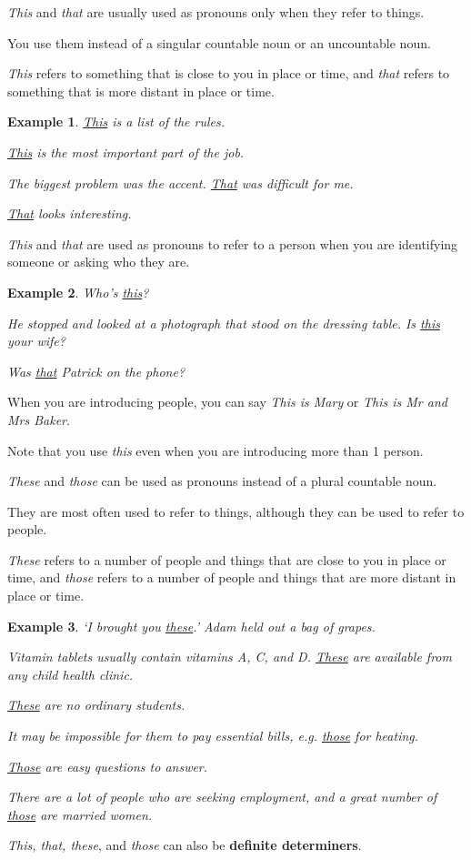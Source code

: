 \documentclass[oneside]{book}
\numberwithin{equation}{section}
\newtheorem{example}{Example}[section]
\begin{document}
%
\noindent{} \textit{This} and \textit{that} are usually used as pronouns only when they refer to things.

You use them instead of a singular countable noun or an uncountable noun.

\textit{This} refers to something that is close to you in place or time, and \textit{that} refers to something that is more distant in place or time.
\begin{example}
    \underline{This} is a list of the rules.
    
    \underline{This} is the most important part of the job.
    
    The biggest problem was the accent. \underline{That} was difficult for me.
    
    \underline{That} looks interesting.
\end{example}
%
\noindent{} \textit{This} and \textit{that} are used as pronouns to refer to a person when you are identifying someone or asking who they are.
\begin{example}
    Who's \underline{this}?
    
    He stopped and looked at a photograph that stood on the dressing table. Is \underline{this} your wife?
    
    Was \underline{that} Patrick on the phone?
\end{example}
When you are introducing people, you can say \textit{This is Mary} or \textit{This is Mr and Mrs Baker}.

Note that you use \textit{this} even when you are introducing more than 1 person.

%
\noindent{} \textit{These} and \textit{those} can be used as pronouns instead of a plural countable noun.

They are most often used to refer to things, although they can be used to refer to people.

\textit{These} refers to a number of people and things that are close to you in place or time, and \textit{those} refers to a number of people and things that are more distant in place or time.
\begin{example}
    `I brought you \underline{these}.' Adam held out a bag of grapes.
    
    Vitamin tablets usually contain vitamins A, C, and D. \underline{These} are available from any child health clinic.
    
    \underline{These} are no ordinary students.
    
    It may be impossible for them to pay essential bills, e.g. \underline{those} for heating.
    
    \underline{Those} are easy questions to answer.
    
    There are a lot of people who are seeking employment, and a great number of \underline{those} are married women.
\end{example}
\textit{This, that, these}, and \textit{those} can also be \textbf{definite determiners}.
\end{document}

